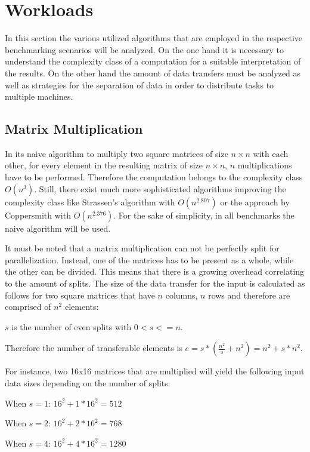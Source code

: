 \section{Workloads}
\label{workload_explanation}
In this section the various utilized algorithms that are employed in the respective benchmarking scenarios will be analyzed. On the one hand it is necessary to understand the complexity class of a computation for a suitable interpretation of the results. On the other hand the amount of data transfers must be analyzed as well as strategies for the separation of data in order to distribute tasks to multiple machines.

\subsection*{Matrix Multiplication}
\label{matrix_multiplication_workload}
In its naive algorithm to multiply two square matrices of size $n\times n$ with each other, for every element in the resulting matrix of size $n\times n$, $n$ multiplications have to be performed. Therefore the computation belongs to the complexity class $O(n^3)$. Still, there exist much more sophisticated algorithms improving the complexity class like Strassen's algorithm with $O(n^{2.807})$\cite{strassen} or the approach by Coppersmith with $O(n^{2.376})$\cite{coppersmith}. For the sake of simplicity, in all benchmarks the naive algorithm will be used.

It must be noted that a matrix multiplication can not be perfectly split for parallelization. Instead, one of the matrices has to be present as a whole, while the other can be divided. This means that there is a growing overhead correlating to the amount of splits. The size of the data transfer for the input is calculated as follows for two square matrices that have $n$ columns, $n$ rows and therefore are comprised of $n^2$ elements:

$s$ is the number of even splits with $0 < s <= n$.

Therefore the number of transferable elements is
$e = s*(\frac{n^2}{s}+n^2) = n^2 + s*n^2$.

For instance, two 16x16 matrices that are multiplied will yield the following input data sizes depending on the number of splits:

When $s=1$: $16^2+1*16^2 = 512$

When $s=2$: $16^2+2*16^2 = 768$

When $s=4$: $16^2 + 4*16^2 = 1280$

